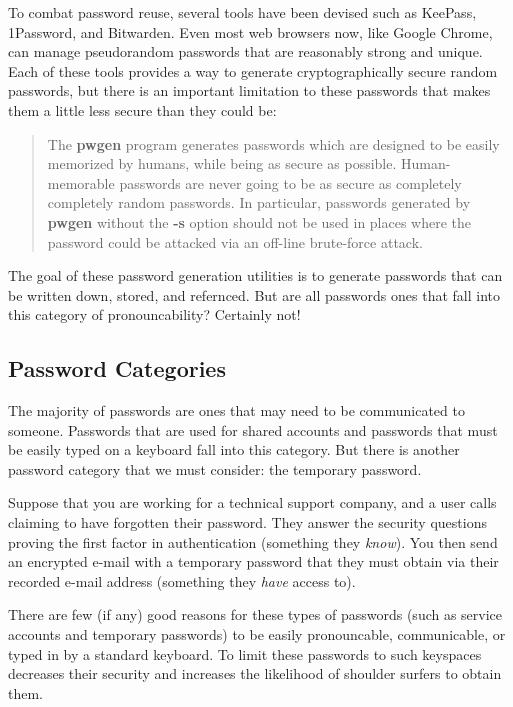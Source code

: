 To combat password reuse, several tools have been devised such as KeePass, 1Password, and Bitwarden. Even most web browsers now, like Google Chrome, can manage pseudorandom passwords that are reasonably strong and unique. Each of these tools provides a way to generate cryptographically secure random passwords, but there is an important limitation to these passwords that makes them a little less secure than they could be:
\begin{quote}
The \textbf{pwgen} program generates passwords which are designed to be easily memorized by humans, while being as secure as possible. Human-memorable passwords are never going to be as secure as completely completely random passwords. In particular, passwords generated by \textbf{pwgen} without the \textbf{-s} option should not be used in places where the password could be attacked via an off-line brute-force attack.\autocite{20210816:pwgen}
\end{quote}

The goal of these password generation utilities is to generate passwords that can be written down, stored, and refernced. But are all passwords ones that fall into this category of pronouncability? Certainly not!

\subsection{Password Categories}

The majority of passwords are ones that may need to be communicated to someone. Passwords that are used for shared accounts and passwords that must be easily typed on a keyboard fall into this category. But there is another password category that we must consider: the temporary password.

Suppose that you are working for a technical support company, and a user calls claiming to have forgotten their password. They answer the security questions proving the first factor in authentication (something they \textit{know}). You then send an encrypted e-mail with a temporary password that they must obtain via their recorded e-mail address (something they \textit{have} access to).

There are few (if any) good reasons for these types of passwords (such as service accounts and temporary passwords) to be easily pronouncable, communicable, or typed in by a standard keyboard. To limit these passwords to such keyspaces decreases their security and increases the likelihood of shoulder surfers to obtain them.

